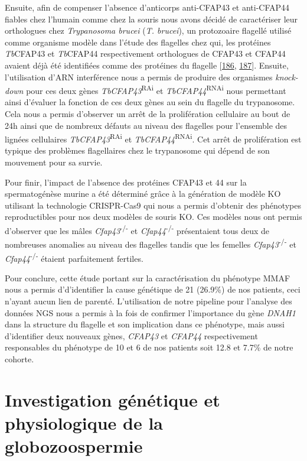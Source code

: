 \documentclass[12pt,a4paper,twoside]{ugathesis}
\theoremstyle{definition}
\theoremstyle{definition}
\theoremstyle{definition}
\theoremstyle{remark}
\begin{document}
Ensuite, afin de compenser l'absence d'anticorps anti-CFAP43 et
anti-CFAP44 fiables chez l'humain comme chez la souris nous avons décidé
de caractériser leur orthologues chez \emph{Trypanosoma brucei}
(\emph{T. brucei}), un protozoaire flagellé utilisé comme organisme
modèle dans l'étude des flagelles chez qui, les protéines
\emph{Tb}CFAP43 et \emph{Tb}CFAP44 respectivement orthologues de CFAP43
et CFAP44 avaient déjà été identifiées comme des protéines du flagelle
{[}\protect\hyperlink{ref-Broadhead2006}{186},
\protect\hyperlink{ref-Subota2014}{187}{]}. Ensuite, l'utilisation d'ARN
interférence nous a permis de produire des organismes \emph{knock-down}
pour ces deux gènes \emph{TbCFAP43}\textsuperscript{RAi} et
\emph{TbCFAP44}\textsuperscript{RNAi} nous permettant ainsi d'évaluer la
fonction de ces deux gènes au sein du flagelle du trypanosome. Cela nous
a permis d'observer un arrêt de la prolifération cellulaire au bout de
24h ainsi que de nombreux défauts au niveau des flagelles pour
l'ensemble des lignées cellulaires \emph{TbCFAP43}\textsuperscript{RAi}
et \emph{TbCFAP44}\textsuperscript{RNAi}. Cet arrêt de prolifération est
typique des problèmes flagellaires chez le trypanosome qui dépend de son
mouvement pour sa survie.

Pour finir, l'impact de l'absence des protéines CFAP43 et 44 sur la
spermatogénèse murine a été déterminé grâce à la génération de modèle KO
utilisant la technologie CRISPR-Cas9 qui nous a permis d'obtenir des
phénotypes reproductibles pour nos deux modèles de souris KO. Ces
modèles nous ont permis d'observer que les mâles
\emph{Cfap43}\textsuperscript{-/-} et \emph{Cfap44}\textsuperscript{-/-}
présentaient tous deux de nombreuses anomalies au niveau des flagelles
tandis que les femelles \emph{Cfap43}\textsuperscript{-/-} et
\emph{Cfap44}\textsuperscript{-/-} étaient parfaitement fertiles.

Pour conclure, cette étude portant sur la caractérisation du phénotype
MMAF nous a permis d'd'identifier la cause génétique de 21 (26.9\%) de
nos patients, ceci n'ayant aucun lien de parenté. L'utilisation de notre
pipeline pour l'analyse des données NGS nous a permis à la fois de
confirmer l'importance du gène \emph{DNAH1} dans la structure du
flagelle et son implication dans ce phénotype, mais aussi d'identifier
deux nouveaux gènes, \emph{CFAP43} et \emph{CFAP44} respectivement
responsables du phénotype de 10 et 6 de nos patients soit 12.8 et 7.7\%
de notre cohorte.

\hypertarget{globo}{\chapter{Investigation génétique et physiologique de
la globozoospermie}\label{globo}}
\end{document}
